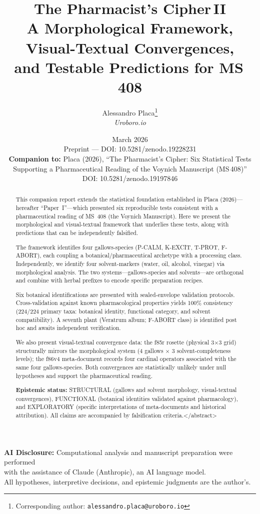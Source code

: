 \documentclass[11pt,a4paper]{article}
\title{\textbf{The Pharmacist's Cipher\,II}\\[0.5em]
\large A Morphological Framework, Visual-Textual Convergences,\\and Testable Predictions for MS\,408}
\author{Alessandro Placa\thanks{Corresponding author: \texttt{alessandro.placa@uroboro.io}}\\
\textit{Uroboro.io}}
\date{March 2026\\[0.3em]
\small Preprint --- DOI: 10.5281/zenodo.19228231\\[0.5em]
\small\textbf{Companion to:} Placa (2026), ``The Pharmacist's Cipher: Six Statistical Tests\\Supporting a Pharmaceutical Reading of the Voynich Manuscript (MS\,408)''\\
\small DOI: 10.5281/zenodo.19197846}
\begin{document}
\maketitle

\begin{center}
\small
\textbf{AI Disclosure:} Computational analysis and manuscript preparation were performed\\
with the assistance of Claude (Anthropic), an AI language model.\\
All hypotheses, interpretive decisions, and epistemic judgments are the author's.
\end{center}

\begin{abstract}
This companion report extends the statistical foundation established in Placa (2026)---hereafter ``Paper~I''---which presented six reproducible tests consistent with a pharmaceutical reading of MS~408 (the Voynich Manuscript). Here we present the morphological and visual-textual framework that underlies these tests, along with predictions that can be independently falsified.

The framework identifies four gallows-species (P-CALM, K-EXCIT, T-PROT, F-ABORT), each coupling a botanical/pharmaceutical archetype with a processing class. Independently, we identify four solvent-markers (water, oil, alcohol, vinegar) via morphological analysis. The two systems---gallows-species and solvents---are orthogonal and combine with herbal prefixes to encode specific preparation recipes.

Six botanical identifications are presented with sealed-envelope validation protocols. Cross-validation against known pharmacological properties yields 100\% consistency (224/224 primary taxa: botanical identity, functional category, and solvent compatibility). A seventh plant (Veratrum album; F-ABORT class) is identified post hoc and awaits independent verification.

We also present visual-textual convergence data: the f85r rosette (physical 3×3 grid) structurally mirrors the morphological system (4 gallows × 3 solvent-completeness levels); the f86v4 meta-document records four cardinal operators associated with the same four gallows-species. Both convergences are statistically unlikely under null hypotheses and support the pharmaceutical reading.

\textbf{Epistemic status:} STRUCTURAL (gallows and solvent morphology, visual-textual convergences), FUNCTIONAL (botanical identities validated against pharmacology), and EXPLORATORY (specific interpretations of meta-documents and historical attribution). All claims are accompanied by falsification criteria.</abstract>


\end{abstract}
\end{document}

